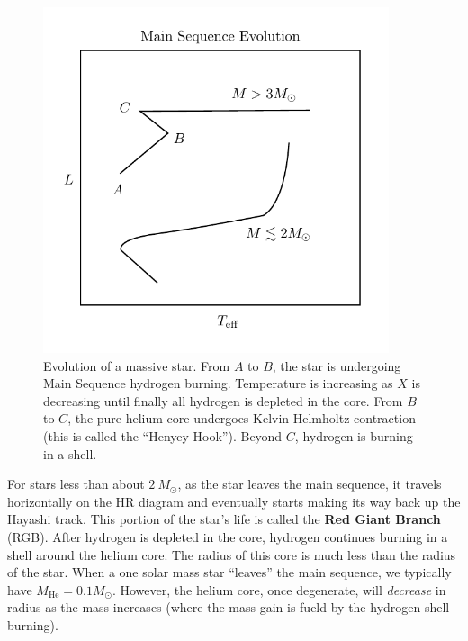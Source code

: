 \documentclass[10pt]{article}
\numberwithin{equation}{section}
\begin{document}
    \begin{figure}[h!]
      \centering
      \includegraphics[width = 4in]{MSDiagram.pdf}
      \caption{Evolution of a massive star. From $A$ to $B$, the star
        is undergoing Main Sequence hydrogen burning. Temperature is
        increasing as $X$ is decreasing until finally all hydrogen is
        depleted in the core. From $B$ to $C$, the pure helium core
        undergoes Kelvin-Helmholtz contraction (this is called the
        ``Henyey Hook''). Beyond $C$, hydrogen is burning in a shell.}
      \label{fig:2}
    \end{figure}

    For stars less than about $2\ M_\odot$, as the star leaves the
    main sequence, it travels horizontally on the HR diagram and
    eventually starts making its way back up the Hayashi track. This
    portion of the star's life is called the \textbf{Red Giant Branch}
    (RGB). After hydrogen is depleted in the core, hydrogen continues
    burning in a shell around the helium core. The radius of this core
    is much less than the radius of the star. When a one solar mass
    star ``leaves'' the main sequence, we typically have
    $M_{\mathrm{He}}=0.1 M_\odot$. However, the helium core, once
    degenerate, will \emph{decrease} in radius as the mass increases
    (where the mass gain is fueld by the hydrogen shell burning).\\
    
\end{document}
